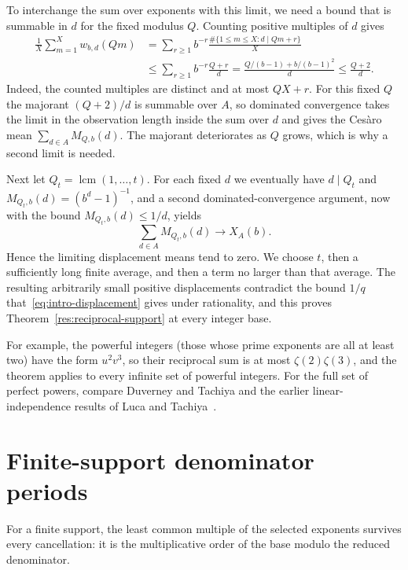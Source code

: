 \documentclass[11pt]{article}
\begin{document}
To interchange the sum over exponents with this limit, we need a bound
that is summable in $d$ for the fixed modulus $Q$. Counting positive
multiples of $d$ gives
\begin{align*}
 \frac1X\sum_{m=1}^Xw_{b,d}(Qm)
 &=\sum_{r\ge1}b^{-r}
       \frac{\#\{1\le m\le X:d\mid Qm+r\}}X\\
 &\le\sum_{r\ge1}b^{-r}\frac{Q+r}{d}
 =\frac{Q/(b-1)+b/(b-1)^2}{d}\le\frac{Q+2}{d}.
\end{align*}
Indeed, the counted multiples are distinct and at most $QX+r$. For
this fixed $Q$ the majorant $(Q+2)/d$ is summable over $A$, so dominated
convergence takes the limit in the observation length inside the sum
over $d$ and gives the Ces\`aro mean $\sum_{d\in A}M_{Q,b}(d)$. The
majorant deteriorates as $Q$ grows, which is why a second limit is
needed.

Next let $Q_t=\operatorname{lcm}(1,\ldots,t)$. For each fixed $d$ we
eventually have $d\mid Q_t$ and $M_{Q_t,b}(d)=(b^d-1)^{-1}$, and a
second dominated-convergence argument, now with the bound
$M_{Q_t,b}(d)\le1/d$, yields
\begin{equation}
 \sum_{d\in A}M_{Q_t,b}(d)\longrightarrow X_A(b).
 \label{eq:lcm-prefix-orbit-limit}
\end{equation}
Hence the limiting displacement means tend to zero. We choose $t$,
then a sufficiently long finite average, and then a term no larger than
that average. The resulting arbitrarily small positive displacements
contradict the bound $1/q$ that~\eqref{eq:intro-displacement} gives
under rationality, and this proves Theorem~\ref{res:reciprocal-support}
at every integer base.

For example, the powerful integers (those whose prime exponents are all
at least two) have the form $u^2v^3$, so their reciprocal sum is at
most $\zeta(2)\zeta(3)$, and the theorem applies to every infinite set
of powerful integers. For the full set of perfect powers, compare
Duverney and Tachiya \cite[Corollary~1.2, p.~4]{duverneytachiya} and
the earlier linear-independence results of Luca and
Tachiya~\cite{lucatachiya2014independence}.

\section{Finite-support denominator periods}\label{sec:period}

For a finite support, the least common multiple of the selected
exponents survives every cancellation: it is the multiplicative order
of the base modulo the reduced denominator.
\end{document}
